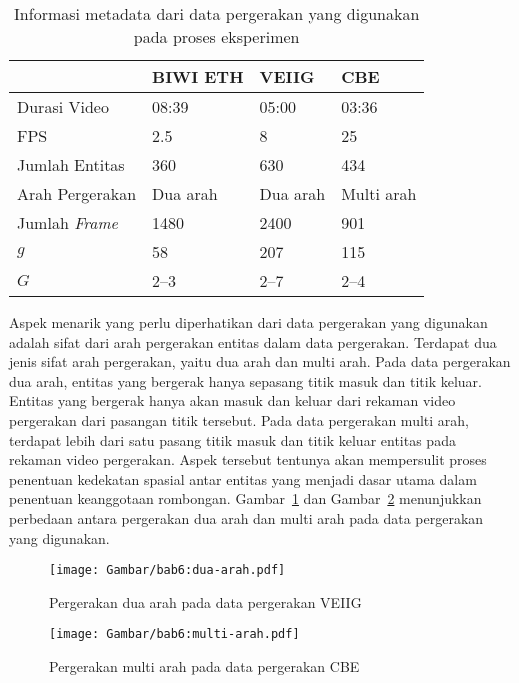 \begin{table}[h]
    \centering
    \caption[Metadata sumber data pergerakan]{Informasi metadata dari data pergerakan yang digunakan pada proses eksperimen}
    \begin{tabular}{p{3cm} p{2.5cm} p{2.5cm} p{3cm}}
        \hline
        & \textbf{BIWI ETH} & \textbf{VEIIG} & \textbf{CBE} \\
        \hline
        Durasi Video & 08:39 & 05:00 & 03:36 \\
        FPS & 2.5 & 8 & 25 \\
        Jumlah Entitas & 360 & 630 & 434 \\
        Arah Pergerakan & Dua arah & Dua arah & Multi arah \\
        Jumlah \textit{Frame} & 1480 & 2400 & 901 \\
        $g$ & 58 & 207 & 115 \\
        $G$ & 2--3 & 2--7 & 2--4 \\
        \hline
    \end{tabular}
    \label{bab6:metadata-pergerakan}
\end{table}

Aspek menarik yang perlu diperhatikan dari data pergerakan yang digunakan adalah sifat dari arah pergerakan entitas dalam data pergerakan. Terdapat dua jenis sifat arah pergerakan, yaitu dua arah dan multi arah. Pada data pergerakan dua arah, entitas yang bergerak hanya sepasang titik masuk dan titik keluar. Entitas yang bergerak hanya akan masuk dan keluar dari rekaman video pergerakan dari pasangan titik tersebut. Pada data pergerakan multi arah, terdapat lebih dari satu pasang titik masuk dan titik keluar entitas pada rekaman video pergerakan. Aspek tersebut tentunya akan mempersulit proses penentuan kedekatan spasial antar entitas yang menjadi dasar utama dalam penentuan keanggotaan rombongan. Gambar~\ref{bab6:dua-arah} dan Gambar~\ref{bab6:multi-arah} menunjukkan perbedaan antara pergerakan dua arah dan multi arah pada data pergerakan yang digunakan.

\begin{figure}[t]
    \centering
    \captionsetup{width=.65\textwidth}
    \texttt{[image: Gambar/bab6:dua-arah.pdf]}
    \caption[Pergerakan dua arah]{Pergerakan dua arah pada data pergerakan VEIIG}
    \label{bab6:dua-arah}
\end{figure}

\begin{figure}[t!]
    \centering
    \captionsetup{width=.65\textwidth}
    \texttt{[image: Gambar/bab6:multi-arah.pdf]}
    \caption[Pergerakan multi arah]{Pergerakan multi arah pada data pergerakan CBE}
    \label{bab6:multi-arah}
\end{figure}

